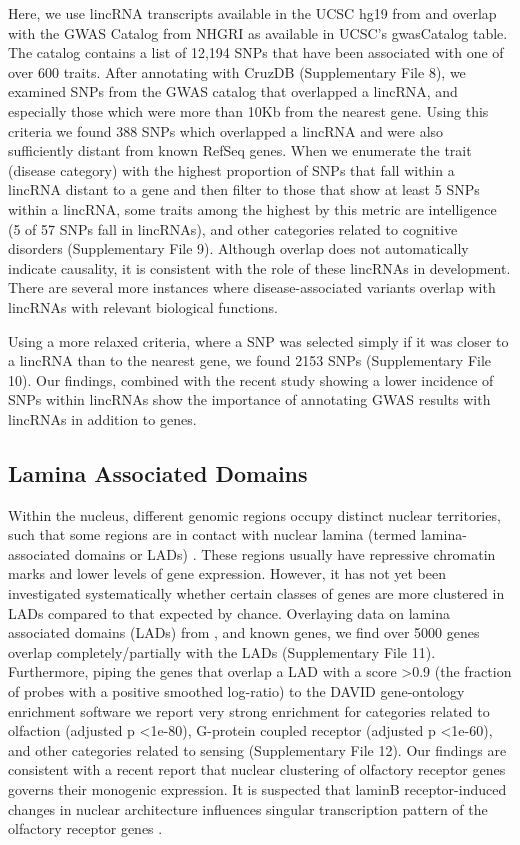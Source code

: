 \documentclass{bioinfo}
\begin{document}
Here, we use lincRNA transcripts available in the UCSC hg19 from \citep{Cabili} and overlap  with the GWAS Catalog from NHGRI \citep{Hindorff} as available in UCSC's gwasCatalog table. The catalog contains a list of 12,194 SNPs that have been associated with one of over 600 traits. After annotating with CruzDB (Supplementary File 8), we examined SNPs from the GWAS catalog that overlapped a lincRNA, and especially those which were more than 10Kb from the nearest gene. Using this criteria we found 388 SNPs which overlapped a lincRNA and were also sufficiently distant from known RefSeq genes. When we enumerate the trait (disease category) with the highest proportion of SNPs that fall within a lincRNA distant to a gene and then filter to those that show at least 5 SNPs within a lincRNA, some traits among the highest by this metric are intelligence (5 of 57 SNPs fall in lincRNAs), and other categories related to cognitive disorders (Supplementary File 9). Although overlap does not automatically indicate causality, it is consistent with the role of these lincRNAs in development. There are several more instances where disease-associated variants overlap with lincRNAs with relevant biological functions. 

Using a more relaxed criteria, where a SNP was selected simply if it was closer to a lincRNA than to the nearest gene, we found 2153 SNPs (Supplementary File 10). Our findings, combined with the recent study showing a lower incidence of SNPs within lincRNAs \citep{Chen} show the importance of annotating GWAS results with lincRNAs in addition to genes.

\subsection{Lamina Associated Domains}
Within the nucleus, different genomic regions occupy distinct nuclear territories, such that some regions are in contact with nuclear lamina (termed lamina-associated domains or LADs) \citep{Guelen,Dittmer}. These regions usually have repressive chromatin marks and lower levels of gene expression. However, it has not yet been investigated systematically whether certain classes of genes are more clustered in LADs compared to that expected by chance. Overlaying data on lamina associated domains (LADs) from \citep{Guelen}, and known genes, we find over 5000 genes overlap completely/partially with the LADs (Supplementary File 11). Furthermore, piping the genes that overlap a LAD with a score \textgreater 0.9 (the fraction of probes with a positive smoothed log-ratio) to the DAVID gene-ontology enrichment software \citep{Huang} we report very strong enrichment for categories related to olfaction (adjusted p \textless 1e-80), G-protein coupled receptor (adjusted p \textless 1e-60), and other categories related to sensing (Supplementary File 12).  Our findings are consistent with a recent report \citep{Clowney} that nuclear clustering of olfactory receptor genes governs their monogenic expression. It is suspected that laminB receptor-induced changes in nuclear architecture influences singular transcription pattern of the olfactory receptor genes \citep{Clowney}.
\end{document}
